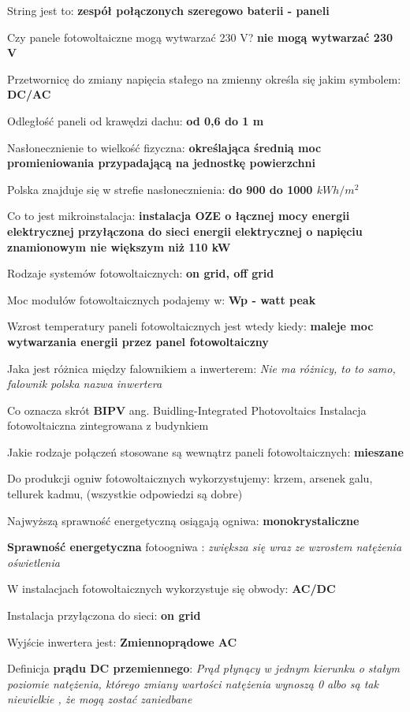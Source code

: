 \documentclass[12pt,a4paper]{article}
\begin{document}
String jest to: \textbf{zespół połączonych szeregowo baterii - paneli}

Czy panele fotowoltaiczne mogą wytwarzać 230 V? \textbf{nie mogą wytwarzać 230 V}

Przetwornicę do zmiany napięcia stałego na zmienny określa się jakim symbolem: \textbf{DC/AC}

Odległość paneli od krawędzi dachu: \textbf{od 0,6 do 1 m}

Nasłonecznienie to wielkość fizyczna: \textbf{określająca średnią moc promieniowania przypadającą na jednostkę powierzchni}

Polska znajduje się w strefie nasłonecznienia: \textbf{do 900 do 1000 ${kWh/m^{2}}$}

Co to jest mikroinstalacja: \textbf{instalacja OZE o łącznej mocy energii elektrycznej przyłączona do sieci energii elektrycznej o napięciu znamionowym nie większym niż 110 kW}

Rodzaje systemów fotowoltaicznych: \textbf{on grid, off grid}

Moc modułów fotowoltaicznych podajemy w: \textbf{Wp - watt peak}

Wzrost temperatury paneli fotowoltaicznych jest wtedy kiedy:
\textbf{maleje moc wytwarzania energii przez panel fotowoltaiczny}

Jaka jest różnica między falownikiem a inwerterem:
\textit{Nie ma różnicy, to to samo, falownik polska nazwa inwertera}

Co oznacza skrót \textbf{BIPV} ang. Buidling-Integrated Photovoltaics
Instalacja fotowoltaiczna zintegrowana z budynkiem

Jakie rodzaje połączeń stosowane są wewnątrz paneli fotowoltaicznych: \textbf{mieszane}

Do produkcji ogniw fotowoltaicznych wykorzystujemy:
krzem, arsenek galu, tellurek kadmu, (wszystkie odpowiedzi są dobre)

Najwyższą sprawność energetyczną osiągają ogniwa: \textbf{monokrystaliczne}

\textbf{Sprawność energetyczna} fotoogniwa :\textit{ zwiększa się wraz ze wzrostem natężenia oświetlenia}

W instalacjach fotowoltaicznych wykorzystuje się obwody: \textbf{AC/DC}

Instalacja przyłączona do sieci: \textbf{on grid}

Wyjście inwertera jest: \textbf{Zmiennoprądowe AC}

Definicja \textbf{prądu DC przemiennego}:
\textit{Prąd płynący w jednym kierunku o stałym poziomie natężenia, którego zmiany wartości natężenia wynoszą 0 albo są tak niewielkie , że mogą zostać zaniedbane}
\end{document}
